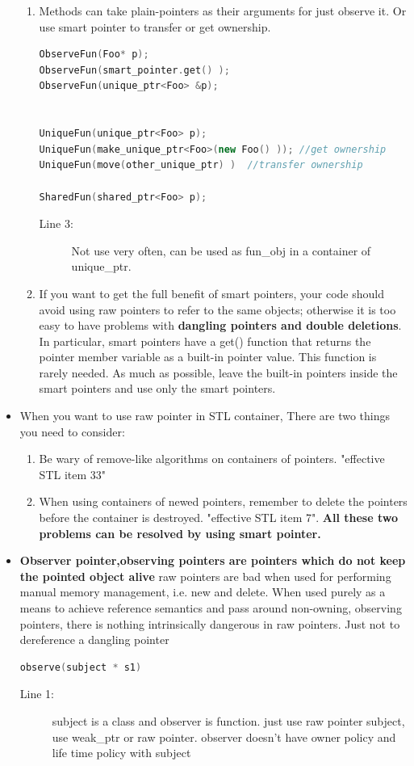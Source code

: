 \documentclass[a4paper,11pt,twoside]{book}
\begin{document}
\begin{itemize}
\begin{enumerate}
\item Methods can take plain-pointers as their arguments for just observe it. Or use smart pointer to transfer or get ownership.
\begin{lstlisting}[frame=single, language=c++]
ObserveFun(Foo* p);
ObserveFun(smart_pointer.get() );
ObserveFun(unique_ptr<Foo> &p);


UniqueFun(unique_ptr<Foo> p);
UniqueFun(make_unique_ptr<Foo>(new Foo() )); //get ownership
UniqueFun(move(other_unique_ptr) )  //transfer ownership

SharedFun(shared_ptr<Foo> p);
\end{lstlisting}
\begin{description}
	\item[Line 3:] Not use very often, can be used as fun\_obj in a container of unique\_ptr.
\end{description}

\item If you want to get the full benefit of smart pointers, your code should avoid using raw pointers to refer to the same objects; otherwise it is too easy to have problems with \textbf{dangling pointers and double deletions}. In particular, smart pointers have a get() function that returns the pointer member variable as a built-in pointer value. This function is rarely needed. As much as possible, leave the built-in pointers inside the smart pointers and use only the smart pointers.
\end{enumerate}


\item When you want to use raw pointer in STL container, There are two things you need to consider:
\begin{enumerate}
\item  Be wary of remove-like algorithms on containers of pointers. "effective STL item 33"

\item When using containers of newed pointers, remember to delete the pointers before the container is destroyed. "effective STL item 7". \textbf{All these two problems can be resolved by using smart pointer.}
\end{enumerate}

\item \textbf{Observer pointer,observing pointers are pointers which do not keep the pointed object alive} raw pointers are bad when used for performing manual memory management, i.e. new and delete. When used purely as a means to achieve reference semantics and pass around non-owning, observing pointers, there is nothing intrinsically dangerous in raw pointers. Just not to dereference a dangling pointer
\begin{lstlisting}[frame=single, language=c++]
observe(subject * s1)
\end{lstlisting}
\begin{description}
	\item[Line 1:] subject is a class and observer is function. just use raw pointer subject, use weak\_ptr or raw pointer. observer doesn't have owner policy and life time policy with subject
\end{description}


\end{itemize}
\end{document}
